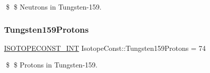 \$ \$ Neutrons in Tungsten-\/159. \mbox{\label{group___isotope_const-_tungsten-_w159_ga2b3dd2781cbb28ebfe022fb63293eb54}} 
\subsubsection{\texorpdfstring{Tungsten159\+Protons}{Tungsten159Protons}}
{\footnotesize\ttfamily \mbox{\hyperlink{group___isotope_const-_macros_ga5f18360b3e99483a35c32d789e62621c}{I\+S\+O\+T\+O\+P\+E\+C\+O\+N\+S\+T\+\_\+\+I\+NT}} Isotope\+Const\+::\+Tungsten159\+Protons = 74}

\$ \$ Protons in Tungsten-\/159. 